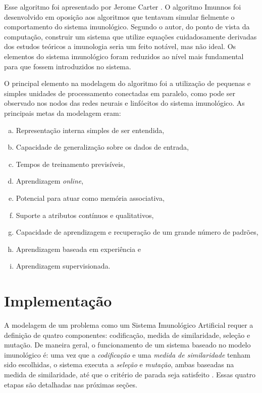 Esse algoritmo foi apresentado por Jerome Carter \cite{Carter2000}. O algoritmo Imunnos foi desenvolvido em oposição aos algoritmos que tentavam simular fielmente o comportamento do sistema imunológico. Segundo o autor, do ponto de vista da computação, construir um sistema que utilize equações cuidadosamente derivadas dos estudos teóricos a imunologia seria um feito notável, mas não ideal. Os elementos do sistema imunológico foram reduzidos ao nível mais fundamental para que fossem introduzidos no sistema.

O principal elemento na modelagem do algoritmo foi a utilização de pequenas e simples unidades de processamento conectadas em paralelo, como pode ser observado nos nodos das redes neurais e linfócitos do sistema imunológico. As principais metas da modelagem eram:

\begin{enumerate}[a)]
    \vspace{2mm}
    \itemsep1pt
    \item Representação interna simples de ser entendida,
    \item Capacidade de generalização sobre os dados de entrada,
    \item Tempos de treinamento previsíveis,
    \item Aprendizagem \emph{online},
    \item Potencial para atuar como memória associativa,
    \item Suporte a atributos contínuos e qualitativos,
    \item Capacidade de aprendizagem e recuperação de um grande número de padrões,
    \item Aprendizagem baseada em experiência e
    \item Aprendizagem supervisionada.
    \vspace{2mm}
\end{enumerate}

\section{Implementação}

A modelagem de um problema como um Sistema Imunológico Artificial requer a definição de quatro componentes: codificação, medida de similaridade, seleção e mutação. De maneira geral, o funcionamento de um sistema baseado no modelo imunológico é: uma vez que a \emph{codificação} e uma \emph{medida de similaridade} tenham sido escolhidas, o sistema executa a \emph{seleção} e \emph{mutação}, ambas baseadas na medida de similaridade, até que o critério de parada seja satisfeito \cite{Aickelin2005}. Essas quatro etapas são detalhadas nas próximas seções.

